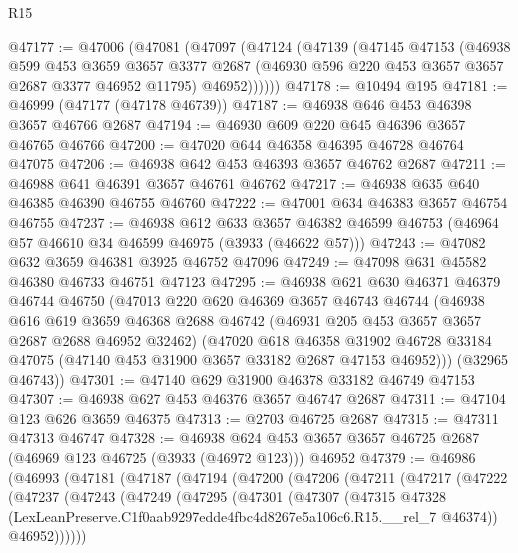 \begin{lexlean}{R15}
\begin{coremodule}
@47177 := @47006
    (@47081
      (@47097
        (@47124
          (@47139
            (@47145
              @47153
              (@46938
                @599
                @453
                @3659
                @3657
                @3377
                @2687
                (@46930 @596 @220 @453 @3657 @3657 @2687 @3377 @46952 @11795)
                @46952))))))
@47178 := @10494 @195
@47181 := @46999 (@47177 (@47178 @46739))
@47187 := @46938 @646 @453 @46398 @3657 @46766 @2687
@47194 := @46930 @609 @220 @645 @46396 @3657 @46765 @46766
@47200 := @47020 @644 @46358 @46395 @46728 @46764 @47075
@47206 := @46938 @642 @453 @46393 @3657 @46762 @2687
@47211 := @46988 @641 @46391 @3657 @46761 @46762
@47217 := @46938 @635 @640 @46385 @46390 @46755 @46760
@47222 := @47001 @634 @46383 @3657 @46754 @46755
@47237 := @46938
    @612
    @633
    @3657
    @46382
    @46599
    @46753
    (@46964 @57 @46610 @34 @46599 @46975 (@3933 (@46622 @57)))
@47243 := @47082 @632 @3659 @46381 @3925 @46752 @47096
@47249 := @47098 @631 @45582 @46380 @46733 @46751 @47123
@47295 := @46938
    @621
    @630
    @46371
    @46379
    @46744
    @46750
    (@47013
      @220
      @620
      @46369
      @3657
      @46743
      @46744
      (@46938
        @616
        @619
        @3659
        @46368
        @2688
        @46742
        (@46931 @205 @453 @3657 @3657 @2687 @2688 @46952 @32462)
        (@47020
          @618
          @46358
          @31902
          @46728
          @33184
          @47075
          (@47140 @453 @31900 @3657 @33182 @2687 @47153 @46952)))
      (@32965 @46743))
@47301 := @47140 @629 @31900 @46378 @33182 @46749 @47153
@47307 := @46938 @627 @453 @46376 @3657 @46747 @2687
@47311 := @47104 @123 @626 @3659 @46375
@47313 := @2703 @46725 @2687
@47315 := @47311 @47313 @46747
@47328 := @46938
    @624
    @453
    @3657
    @3657
    @46725
    @2687
    (@46969 @123 @46725 (@3933 (@46972 @123)))
    @46952
@47379 := @46986
    (@46993
      (@47181
        (@47187
          (@47194
            (@47200
              (@47206
                (@47211
                  (@47217
                    (@47222
                      (@47237
                        (@47243
                          (@47249
                            (@47295
                              (@47301
                                (@47307
                                  (@47315
                                    @47328
                                    (LexLeanPreserve.C1f0aab9297edde4fbc4d8267e5a106c6.R15.__rel_7
                                      @46374))
                                  @46952))))))

\end{coremodule}
\end{lexlean}
